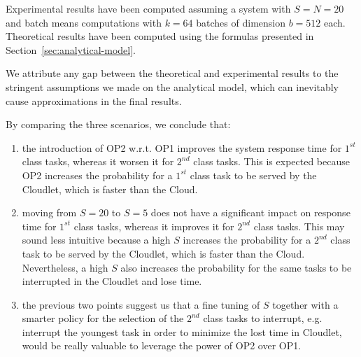 Experimental results have been computed assuming a system with $S=N=20$ and batch means computations with $k=64$ batches of dimension $b=512$ each.
%
Theoretical results have been computed using the formulas presented in Section~\ref{sec:analytical-model}.

We attribute any gap between the theoretical and experimental results to the stringent assumptions we made on the analytical model, which can inevitably cause approximations in the final results.

By comparing the three scenarios, we conclude that:

\begin{enumerate}
	\item the introduction of OP2 w.r.t. OP1 improves the system response time for $1^{st}$ class tasks, whereas it worsen it for $2^{nd}$ class tasks. 
	This is expected because OP2 increases the probability for a $1^{st}$ class task to be served by the Cloudlet, which is faster than the Cloud.
	
	\item moving from $S=20$ to $S=5$ does not have a significant impact on response time for $1^{st}$ class tasks, whereas it improves it for $2^{nd}$ class tasks.
	This may sound less intuitive because a high $S$ increases the probability for a $2^{nd}$ class task to be served by the Cloudlet, which is faster than the Cloud. Nevertheless, a high $S$ also increases the probability for the same tasks to be interrupted in the Cloudlet and lose time.
	
	\item the previous two points suggest us that a fine tuning of $S$ together with a smarter policy for the selection of the $2^{nd}$ class tasks to interrupt, e.g. interrupt the youngest task in order to minimize the lost time in Cloudlet, would be really valuable to leverage the power of OP2 over OP1.
\end{enumerate}


